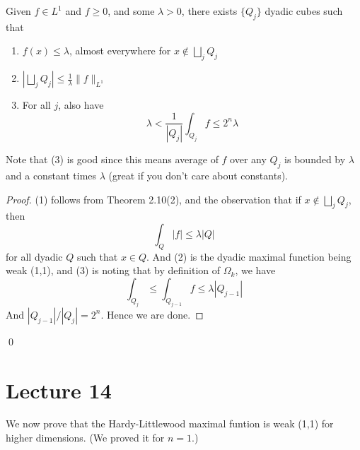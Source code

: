 \begin{theorem}
    Given $f\in L^1$ and $f\geq 0$, and some $\lambda>0$, there exists $\{Q_j\}$ dyadic cubes such that
    \begin{enumerate}
        \item $f(x)\leq\lambda$, almost everywhere for $x\not\in\bigsqcup_jQ_j$
        \item $\left|\bigsqcup_jQ_j \right|\leq\frac{1}{\lambda}\|f\|_{L^1}$
        \item For all $j$, also have
            \begin{equation*}
                \lambda<\frac{1}{|Q_j|}\int_{Q_j}f\leq 2^n\lambda
            \end{equation*}
    \end{enumerate}
\end{theorem}
\begin{remark}
    Note that (3) is good since this means average of $f$ over any $Q_j$ is bounded by $\lambda$ and a constant times $\lambda$ (great if you don't care about constants).
\end{remark}
\begin{proof}
    (1) follows from Theorem 2.10(2), and the observation that if $x\not\in\bigsqcup_jQ_j$, then 
    \begin{equation*}
        \int_{Q}|f|\leq\lambda|Q|
    \end{equation*}
    for all dyadic $Q$ such that $x\in Q$. And (2) is the dyadic maximal function being weak (1,1), and (3) is noting that by definition of $\Omega_k$, we have
    \begin{equation*}
        \int_{Q_j}\leq\int_{Q_{j-1}}f\leq \lambda|Q_{j-1}|
    \end{equation*}
    And $|Q_{j-1}|/|Q_j|=2^n$. Hence we are done.
\end{proof}
\qed


\section{Lecture 14}
We now prove that the Hardy-Littlewood maximal funtion is weak (1,1) for higher dimensions. (We proved it for $n=1$.)

